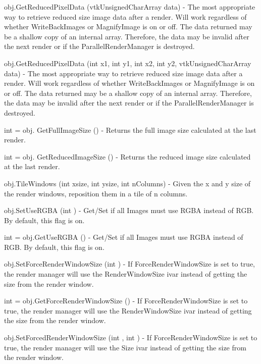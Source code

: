 \begin{DoxyItemize}
\item {\ttfamily obj.\-Get\-Reduced\-Pixel\-Data (vtk\-Unsigned\-Char\-Array data)} -\/ The most appropriate way to retrieve reduced size image data after a render. Will work regardless of whether Write\-Back\-Images or Magnify\-Image is on or off. The data returned may be a shallow copy of an internal array. Therefore, the data may be invalid after the next render or if the Parallel\-Render\-Manager is destroyed.  
\item {\ttfamily obj.\-Get\-Reduced\-Pixel\-Data (int x1, int y1, int x2, int y2, vtk\-Unsigned\-Char\-Array data)} -\/ The most appropriate way to retrieve reduced size image data after a render. Will work regardless of whether Write\-Back\-Images or Magnify\-Image is on or off. The data returned may be a shallow copy of an internal array. Therefore, the data may be invalid after the next render or if the Parallel\-Render\-Manager is destroyed.  
\item {\ttfamily int = obj. Get\-Full\-Image\-Size ()} -\/ Returns the full image size calculated at the last render.  
\item {\ttfamily int = obj. Get\-Reduced\-Image\-Size ()} -\/ Returns the reduced image size calculated at the last render.  
\item {\ttfamily obj.\-Tile\-Windows (int xsize, int ysize, int n\-Columns)} -\/ Given the x and y size of the render windows, reposition them in a tile of n columns.  
\item {\ttfamily obj.\-Set\-Use\-R\-G\-B\-A (int )} -\/ Get/\-Set if all Images must use R\-G\-B\-A instead of R\-G\-B. By default, this flag is on.  
\item {\ttfamily int = obj.\-Get\-Use\-R\-G\-B\-A ()} -\/ Get/\-Set if all Images must use R\-G\-B\-A instead of R\-G\-B. By default, this flag is on.  
\item {\ttfamily obj.\-Set\-Force\-Render\-Window\-Size (int )} -\/ If Force\-Render\-Window\-Size is set to true, the render manager will use the Render\-Window\-Size ivar instead of getting the size from the render window.  
\item {\ttfamily int = obj.\-Get\-Force\-Render\-Window\-Size ()} -\/ If Force\-Render\-Window\-Size is set to true, the render manager will use the Render\-Window\-Size ivar instead of getting the size from the render window.  
\item {\ttfamily obj.\-Set\-Forced\-Render\-Window\-Size (int , int )} -\/ If Force\-Render\-Window\-Size is set to true, the render manager will use the Size ivar instead of getting the size from the render window.  

\end{DoxyItemize}
